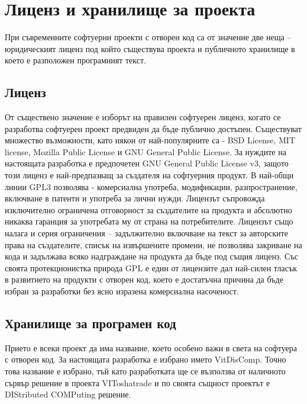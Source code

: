 \documentclass[book,14pt,oneside,openany]{memoir}
\begin{document}
\section{Лиценз и хранилище за проекта}

При съвременните софтуерни проекти с отворен код са от значение две неща – юридическият лиценз под който съществува проекта и публичното хранилище в което е разположен програмният текст. 

\subsection{Лиценз}

От съществено значение е изборът на правилен софтуерен лиценз, когато се разработва софтуерен проект предвиден да бъде публично достъпен. Съществуват множество възможности, като някои от най-популярните са - BSD License, MIT license, Mozilla Public License и GNU General Public License. За нуждите на настоящата разработка е предпочетен GNU General Public License v3, защото този лиценз е най-предпазващ за създателя на софтуерния продукт. В най-общи линии GPL3 позволява - комерсиална употреба, модификации, разпространение, включване в патенти и употреба за лични нужди. Лицензът съпровожда изключително ограничена отговорност за създателите на продукта и абсолютно никаква гаранция за употребата му от страна на потребителите. Лицензът също налага и серия ограничения – задължително включване на текст за авторските права на създателите, списък на извършените промени, не позволява закриване на кода и задължава всяко надграждане на продукта да бъде под същия лиценз. Със своята протекционистка природа GPL е един от лицензите дал най-силен тласък в развитието на продукти с отворен код, което е достатъчна причина да бъде избран за разработки без ясно изразена комерсиална насоченост. 

\subsection{Хранилище за програмен код}

Прието е всеки проект да има название, което особено важи в света на софтуера с отворен код. За настоящата разработка е избрано името VitDisComp. Точно това название е избрано, тъй като разработката ще се възползва от наличното сървър решение в проекта VIToshatrade \cite{vtrade} и по своята същност проектът е DIStributed COMPuting решение. 
\end{document}
